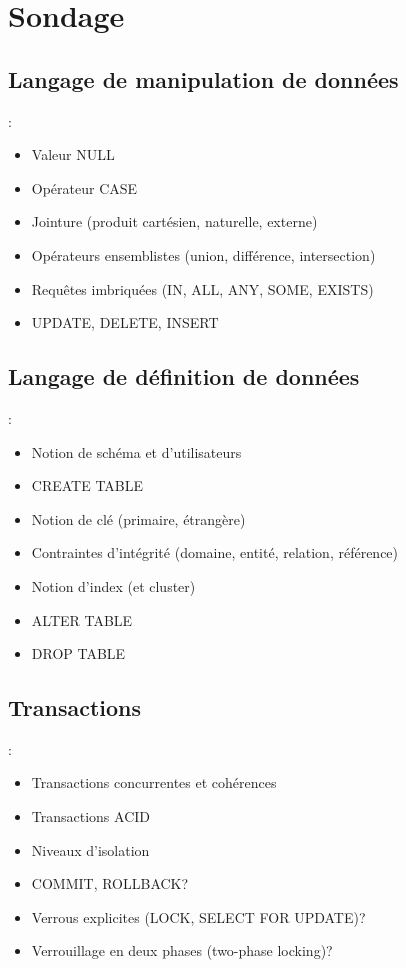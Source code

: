\documentclass[10pt]{beamer}
\begin{document}
\section{Sondage}
\subsection{Langage de manipulation de données}
\begin{frame}{\secname : \subsecname}
    \begin{itemize}
        \item Valeur NULL
        \item Opérateur CASE
        \item Jointure (produit cartésien, naturelle, externe)
        \item Opérateurs ensemblistes (union, différence, intersection)
        \item Requêtes imbriquées (IN, ALL, ANY, SOME, EXISTS)
        \item UPDATE, DELETE, INSERT
    \end{itemize}
\end{frame}

\subsection{Langage de définition de données}
\begin{frame}{\secname : \subsecname}
    \begin{itemize}
        \item Notion de schéma et d’utilisateurs
        \item CREATE TABLE
        \item Notion de clé (primaire, étrangère)
        \item Contraintes d’intégrité (domaine, entité, relation, référence)
        \item Notion d’index (et cluster)
        \item ALTER TABLE
        \item DROP TABLE
    \end{itemize}
\end{frame}

\subsection{Transactions}
\begin{frame}{\secname : \subsecname}
    \begin{itemize}
        \item Transactions concurrentes et cohérences
        \item Transactions ACID
        \item Niveaux d’isolation
        \item COMMIT, ROLLBACK?
        \item Verrous explicites (LOCK, SELECT FOR UPDATE)?
        \item Verrouillage en deux phases (two-phase locking)?
    \end{itemize}
\end{frame}
\end{document}
